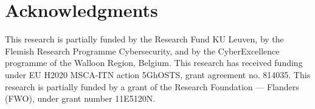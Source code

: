 \documentclass[conference]{IEEEtran}
\begin{document}




%














\ifdefined\ANON
\else
\section*{Acknowledgments}
This research is partially funded by the Research Fund KU Leuven, by the
Flemish Research Programme Cybersecurity, and by the CyberExcellence
programme of the Walloon Region, Belgium. This research has received
funding under EU H2020 MSCA-ITN action 5GhOSTS, grant agreement no. 814035.
This research is partially funded by a grant of the Research Foundation --- Flanders (FWO), under grant number 11E5120N.
\fi




%
%
%



\appendices

%

%



\end{document}
